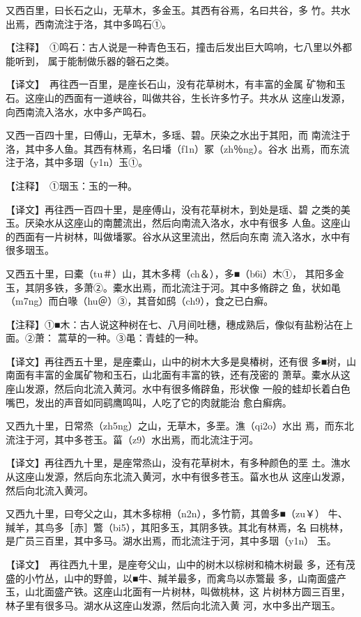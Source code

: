 \documentclass[a4paper,12pt,UTF8,twoside]{ctexbook}
\begin{document}
又西百里，曰长石之山，无草木，多金玉。其西有谷焉，名曰共谷，多 竹。共水出焉，西南流注于洛，其中多鸣石①。

【注释】　①鸣石：古人说是一种青色玉石，撞击后发出巨大鸣响，七八里以外都能听到， 属于能制做乐器的磬石之类。

【译文】　再往西一百里，是座长石山，没有花草树木，有丰富的金属 矿物和玉石。这座山的西面有一道峡谷，叫做共谷，生长许多竹子。共水从 这座山发源，向西南流入洛水，水中多产鸣石。

又西一百四十里，曰傅山，无草木，多瑶、碧。厌染之水出于其阳，而 南流注于洛，其中多人鱼。其西有林焉，名曰墦（f1n）冢（zh％ng）。谷水 出焉，而东流注于洛，其中多珚（y1n）玉①。

【注释】　①珚玉：玉的一种。

【译文】再往西一百四十里，是座傅山，没有花草树木，到处是瑶、碧 之类的美玉。厌染水从这座山的南麓流出，然后向南流入洛水，水中有很多 人鱼。这座山的西面有一片树林，叫做墦冢。谷水从这里流出，然后向东南 流入洛水，水中有很多珚玉。

又西五十里，曰橐（tu＃）山，其木多樗（ch＆），多■（b6i）木①， 其阳多金玉，其阴多铁，多萧②。橐水出焉，而北流注于河。其中多脩辟之 鱼，状如黾（m7ng）而白喙（hu＠）③，其音如鸱（ch9），食之已白癣。

【注释】①■木：古人说这种树在七、八月间吐穗，穗成熟后，像似有盐粉沾在上面。②萧： 蒿草的一种。③黾：青蛙的一种。

【译文】再往西五十里，是座橐山，山中的树木大多是臭椿树，还有很 多■树，山南面有丰富的金属矿物和玉石，山北面有丰富的铁，还有茂密的 萧草。橐水从这座山发源，然后向北流入黄河。水中有很多脩辟鱼，形状像 一般的蛙却长着白色嘴巴，发出的声音如同鹞鹰鸣叫，人吃了它的肉就能治 愈白癣病。

又西九十里，日常烝（zh5ng）之山，无草木，多垩。潐（qi2o）水出 焉，而东北流注于河，其中多苍玉。菑（z9）水出焉，而北流注于河。

【译文】再往西九十里，是座常烝山，没有花草树木，有多种颜色的垩 土。潐水从这座山发源，然后向东北流入黄河，水中有很多苍玉。菑水也从 这座山发源，然后向北流入黄河。

又西九十里，曰夸父之山，其木多棕枏（n2n），多竹箭，其兽多■（zu￥） 牛、羬羊，其鸟多［赤］鷩（bi5），其阳多玉，其阴多铁。其北有林焉，名 曰桃林，是广员三百里，其中多马。湖水出焉，而北流注于河，其中多珚（y1n） 玉。

【译文】　再往西九十里，是座夸父山，山中的树木以棕树和楠木树最 多，还有茂盛的小竹丛，山中的野兽，以■牛、羬羊最多，而禽鸟以赤鷩最 多，山南面盛产玉，山北面盛产铁。这座山北面有一片树林，叫做桃林，这 片树林方圆三百里，林子里有很多马。湖水从这座山发源，然后向北流入黄 河，水中多出产珚玉。
\end{document}
